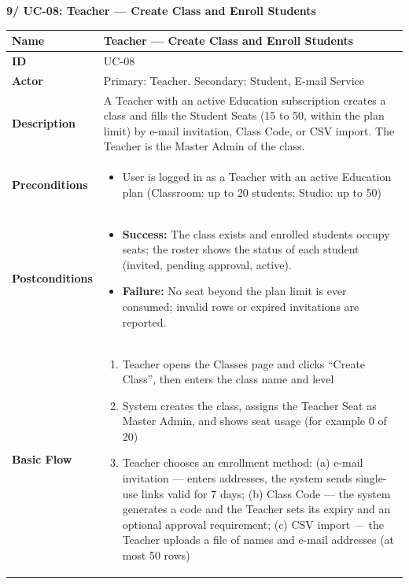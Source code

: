 \documentclass[a4paper]{article}
\newlength{\ucLeft}
\begin{document}
\vspace{0.5em}
\noindent\textbf{9/ UC-08: Teacher --- Create Class and Enroll Students}

\begin{longtable}{|>{\bfseries}p{\ucLeft}|p{\dimexpr\linewidth-\ucLeft-2\tabcolsep-2\arrayrulewidth}|}
\hline
Name & Teacher --- Create Class and Enroll Students \\ \hline
ID & UC-08 \\ \hline
Actor & Primary: Teacher. Secondary: Student, E-mail Service \\ \hline
Description & A Teacher with an active Education subscription creates a class and fills the Student Seats (15 to 50, within the plan limit) by e-mail invitation, Class Code, or CSV import. The Teacher is the Master Admin of the class. \\ \hline
Preconditions &
\begin{itemize}[leftmargin=1em, nosep, topsep=2pt, partopsep=0pt, parsep=0pt, after=\strut]
    \item User is logged in as a Teacher with an active Education plan (Classroom: up to 20 students; Studio: up to 50)
\end{itemize}
\\ \hline
Postconditions &
\begin{itemize}[leftmargin=1em, nosep, topsep=2pt, partopsep=0pt, parsep=0pt, after=\strut]
    \item \textbf{Success:} The class exists and enrolled students occupy seats; the roster shows the status of each student (invited, pending approval, active).
    \item \textbf{Failure:} No seat beyond the plan limit is ever consumed; invalid rows or expired invitations are reported.
\end{itemize}
\\ \hline
Basic Flow &
\begin{enumerate}[leftmargin=1.5em, nosep, topsep=2pt, partopsep=0pt, parsep=0pt, after=\strut]
    \item Teacher opens the Classes page and clicks ``Create Class'', then enters the class name and level
    \item System creates the class, assigns the Teacher Seat as Master Admin, and shows seat usage (for example 0 of 20)
    \item Teacher chooses an enrollment method: (a) e-mail invitation --- enters addresses, the system sends single-use links valid for 7 days; (b) Class Code --- the system generates a code and the Teacher sets its expiry and an optional approval requirement; (c) CSV import --- the Teacher uploads a file of names and e-mail addresses (at most 50 rows)

\end{enumerate}
\end{longtable}
\end{document}
